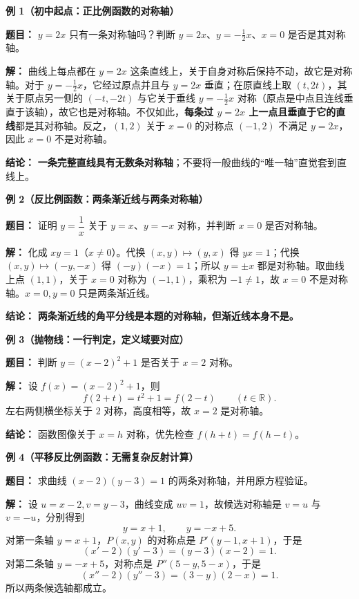\begin{examplebox}
\textbf{\textcolor{CExample}{例 1（初中起点：正比例函数的对称轴）}}



\textbf{题目：} $y=2x$ 只有一条对称轴吗？判断 $y=2x$、$y=-\frac12x$、$x=0$ 是否是其对称轴。

\textbf{解：} 曲线上每点都在 $y=2x$ 这条直线上，关于自身对称后保持不动，故它是对称轴。对于 $y=-\frac12x$，它经过原点并且与 $y=2x$ 垂直；在原直线上取 $(t,2t)$，其关于原点另一侧的 $(-t,-2t)$ 与它关于垂线 $y=-\frac12x$ 对称（原点是中点且连线垂直于该轴），故它也是对称轴。不仅如此，\textbf{每条过 $y=2x$ 上一点且垂直于它的直线}都是其对称轴。反之，$(1,2)$ 关于 $x=0$ 的对称点 $(-1,2)$ 不满足 $y=2x$，因此 $x=0$ 不是对称轴。

\textbf{结论：} \textbf{一条完整直线具有无数条对称轴}；不要将一般曲线的“唯一轴”直觉套到直线上。

\medskip
\textbf{\textcolor{CExample}{例 2（反比例函数：两条渐近线与两条对称轴）}}

\textbf{题目：} 证明 $y=\dfrac1x$ 关于 $y=x$、$y=-x$ 对称，并判断 $x=0$ 是否对称轴。

\textbf{解：} 化成 $xy=1$（$x\ne0$）。代换 $(x,y)\mapsto(y,x)$ 得 $yx=1$；代换 $(x,y)\mapsto(-y,-x)$ 得 $(-y)(-x)=1$；所以 $y=\pm x$ 都是对称轴。取曲线上点 $(1,1)$，关于 $x=0$ 对称为 $(-1,1)$，乘积为 $-1\ne1$，故 $x=0$ 不是对称轴。$x=0,y=0$ 只是两条渐近线。

\textbf{结论：} \textbf{两条渐近线的角平分线是本题的对称轴，但渐近线本身不是。}

\medskip
\textbf{\textcolor{CExample}{例 3（抛物线：一行判定，定义域要对应）}}

\textbf{题目：} 判断 $y=(x-2)^2+1$ 是否关于 $x=2$ 对称。

\textbf{解：} 设 $f(x)=(x-2)^2+1$，则
\[
  f(2+t)=t^2+1=f(2-t)\qquad(t\in\mathbb R).
\]
左右两侧横坐标关于 $2$ 对称，高度相等，故 $\boxed{x=2}$ 是对称轴。

\textbf{结论：} 函数图像关于 $x=h$ 对称，优先检查 $f(h+t)=f(h-t)$。

\medskip
\textbf{\textcolor{CExample}{例 4（平移反比例函数：无需复杂反射计算）}}

\textbf{题目：} 求曲线 $(x-2)(y-3)=1$ 的两条对称轴，并用原方程验证。

\textbf{解：} 设 $u=x-2,v=y-3$，曲线变成 $uv=1$，故候选对称轴是 $v=u$ 与 $v=-u$，分别得到
\[
  \boxed{y=x+1},\qquad\boxed{y=-x+5}.
\]
对第一条轴 $y=x+1$，$P(x,y)$ 的对称点是 $P'(y-1,x+1)$，于是
\[
  (x'-2)(y'-3)=(y-3)(x-2)=1.
\]
对第二条轴 $y=-x+5$，对称点是 $P''(5-y,5-x)$，于是
\[
  (x''-2)(y''-3)=(3-y)(2-x)=1.
\]
所以两条候选轴都成立。


\end{examplebox}
